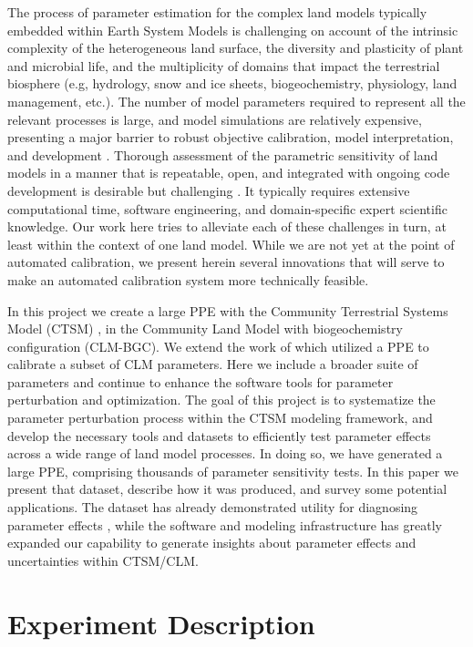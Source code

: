 \documentclass[draft]{agujournal2019}
\begin{document}
The process of parameter estimation for the complex land models typically embedded within Earth System Models is challenging on account of the intrinsic complexity of the heterogeneous land surface, the diversity and plasticity of plant and microbial life, and the multiplicity of domains that impact the terrestrial biosphere (e.g, hydrology, snow and ice sheets, biogeochemistry, physiology, land management, etc.). The number of model parameters required to represent all the relevant processes is large, and model simulations are relatively expensive, presenting a major barrier to robust objective calibration, model interpretation, and development \cite{fisher2020,dagon2020}.
Thorough assessment of the parametric sensitivity of land models in a manner that is repeatable, open, and integrated with ongoing code development is desirable but challenging \cite{hourdin2017,balaji2022}. It typically requires extensive computational time,  software engineering, and domain-specific expert scientific knowledge.
Our work here tries to alleviate each of these challenges in turn, at least within the context of one land model.
While we are not yet at the point of automated calibration, we present herein several innovations that will serve to make an automated calibration system more technically feasible.

In this project we create a large PPE with the Community Terrestrial Systems Model (CTSM) \cite{lawrence2019}, in the Community Land Model with biogeochemistry configuration (CLM-BGC). We extend the work of  which utilized a PPE to calibrate a subset of CLM parameters. Here we include a broader suite of parameters and continue to enhance the software tools for parameter perturbation and optimization.
The goal of this project is to systematize the parameter perturbation process within the CTSM modeling framework, and develop the necessary tools and datasets to efficiently test parameter effects across a wide range of land model processes. 
In doing so, we have generated a large PPE, comprising thousands of parameter sensitivity tests.
In this paper we present that dataset, describe how it was produced, and survey some potential applications.
The dataset has already demonstrated utility for diagnosing parameter effects \cite{cheng2023,yan2023a,yan2023b,zarakas2024}, while the software and modeling infrastructure has greatly expanded our capability to generate insights about parameter effects and uncertainties within CTSM/CLM.




\section{Experiment Description}
\label{methods}
\end{document}
